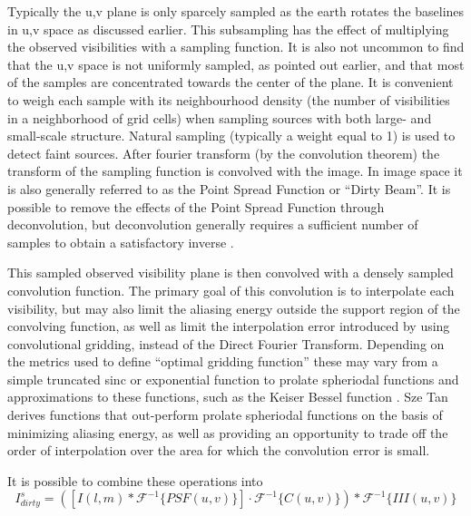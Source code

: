  Typically the u,v plane is only sparcely sampled as the earth rotates the baselines in u,v space as discussed earlier. This subsampling has the effect of multiplying the observed visibilities with a sampling function. It is also
 not uncommon to find that the u,v space is not uniformly sampled, as pointed out earlier, and that most of the samples are concentrated towards the center of the plane. It is convenient to weigh each sample with its neighbourhood density 
 (the number of visibilities in a neighborhood of grid cells) when sampling sources with both large- and small-scale structure. Natural sampling (typically a weight equal to 1) is used to detect faint sources. After fourier transform
 (by the convolution theorem) the transform of the sampling function is convolved with the image. In image space it is also generally referred to as the Point Spread Function or ``Dirty Beam''. It is possible to remove
 the effects of the Point Spread Function through deconvolution, but deconvolution generally requires a sufficient number of samples to obtain a satisfactory inverse \cite{taylor1999synthesis}.
 
 This sampled observed visibility plane is then convolved with a densely sampled convolution function. The primary goal of this convolution is to interpolate each visibility, but may also limit the aliasing energy outside the support 
 region of the convolving function, as well as limit the interpolation error introduced by using convolutional gridding, instead of the Direct Fourier Transform. Depending on the metrics used to define ``optimal gridding function'' these may vary from a simple truncated sinc or exponential function 
 \cite[Lecture 7]{taylor1999synthesis} to prolate spheriodal functions and approximations to these functions, such as the Keiser Bessel function \cite{jackson1991selection}. Sze Tan \cite{tan1986aperture} derives functions that out-perform prolate spheriodal functions
 on the basis of minimizing aliasing energy, as well as providing an opportunity to trade off the order of interpolation over the area for which the convolution error is small.
 
 It is possible to combine these operations into 
 \begin{equation*}
  I^s_{dirty} = ([I(l,m)*\mathcal{F}^{-1}\{PSF(u,v)\}]\cdot\mathcal{F}^{-1}\{C(u,v)\}) * \mathcal{F}^{-1}\{III(u,v)\}
 \end{equation*}
